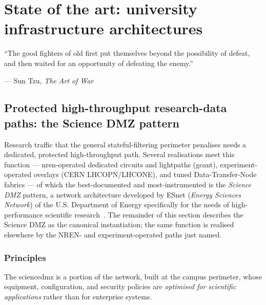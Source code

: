 \section{State of the art: university infrastructure architectures}
\label{sec:etat-art}

\epigraph{``The good fighters of old first put themselves beyond the possibility of defeat, and then waited for an opportunity of defeating the enemy.''}{--- Sun Tzu, \textit{The Art of War}~\cite{suntzu-giles1910}}

\subsection{Protected high-throughput research-data paths: the Science DMZ pattern}
\label{subsec:science-dmz}

Research traffic that the general stateful-filtering perimeter penalises
needs a dedicated, protected high-throughput path. Several realisations
meet this function --- \gls{nren}-operated dedicated circuits and
lightpaths (\gls{geant}), experiment-operated overlays (CERN
LHCOPN/LHCONE), and tuned Data-Transfer-Node fabrics --- of which the
best-documented and most-instrumented is the \emph{Science DMZ} pattern,
a network architecture developed by ESnet (\emph{Energy Sciences
Network}) of the U.S. Department of Energy specifically for the needs of
high-performance scientific research~\cite{dart2013,geant,cern-lhcone}.
The remainder of this section describes the Science DMZ as the canonical
instantiation; the same function is realised elsewhere by the NREN- and
experiment-operated paths just named.

\subsubsection{Principles}

The \gls{sciencedmz} is a portion of the network, built at the campus perimeter,
whose equipment, configuration, and security policies are
\emph{optimised for scientific applications} rather than for enterprise
systems.


